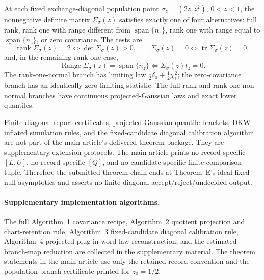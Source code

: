\begin{lemma}\label{lem:dmap-diagonal-covariance-alternatives-main}
At each fixed exchange-diagonal population point
\(\sigma_z=(2z,z^2)\), \(0<z<1\), the nonnegative definite matrix
\(\Sigma_\sigma(z)\) satisfies exactly one of four alternatives: full rank,
rank one with range different from \(\operatorname{span}\{n_z\}\), rank one
with range equal to \(\operatorname{span}\{n_z\}\), or zero covariance.  The
tests are
\[
\operatorname{rank}\Sigma_\sigma(z)=2
\Longleftrightarrow \det\Sigma_\sigma(z)>0,
\qquad
\Sigma_\sigma(z)=0
\Longleftrightarrow \operatorname{tr}\Sigma_\sigma(z)=0,
\]
and, in the remaining rank-one case,
\[
\operatorname{Range}\Sigma_\sigma(z)=\operatorname{span}\{n_z\}
\Longleftrightarrow \Sigma_\sigma(z)t_z=0 .
\]
The rank-one-normal branch has limiting law
\(\frac12\delta_0+\frac12\chi^2_1\); the zero-covariance branch has an
identically zero limiting statistic.  The full-rank and rank-one non-normal
branches have continuous projected-Gaussian laws and exact lower quantiles.
\end{lemma}

\begin{remark}\label{def:finite-diagonal-report-main}\label{prop:finite-diagonal-report-master-main}
Finite diagonal report certificates, projected-Gaussian quantile brackets,
DKW-inflated simulation rules, and the fixed-candidate diagonal calibration
algorithm are not part of the main article's delivered theorem package.  They
are supplementary extension protocols.  The main article prints no
record-specific \([L,U]\), no record-specific \([Q]\), and no candidate-specific
finite comparison tuple.  Therefore the submitted theorem chain ends at
Theorem~E's ideal fixed-null asymptotics and asserts no finite diagonal
accept/reject/undecided output.
\end{remark}

\label{alg:all-complete-cycle-separated-batch-main}
\label{alg:projected-plugin-word-law-reconstruction-main}
\label{app:branch-map-oracle-reduction-main}
\paragraph{Supplementary implementation algorithms.}
The full Algorithm~1 covariance recipe, Algorithm~2 quotient projection and
chart-retention rule, Algorithm~3 fixed-candidate diagonal calibration rule,
Algorithm~4 projected plug-in word-law reconstruction, and the estimated
branch-map reduction are collected in the supplementary material.  The theorem
statements in the main article use only the retained-record convention
 and the population branch certificate
printed for \(z_0=1/2\).
\fi
\fi
